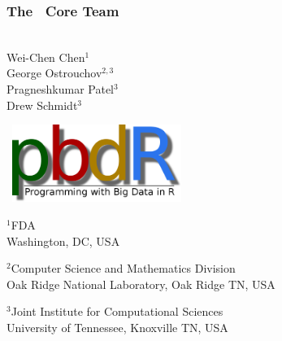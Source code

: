 \frame{\maketitle}

\setcounter{footnote}{0}

\begin{frame}[noframenumbering]
\frametitle{The \pbdR\ Core Team}
\begin{minipage}{1\textwidth}
  \vspace{-.6cm}
\begin{minipage}{3.6cm}
\ \\[.8cm]
Wei-Chen Chen$^1$ \\
George Ostrouchov$^{2,3}$ \\
Pragneshkumar Patel$^3$ \\
Drew Schmidt$^3$\\[2ex]
\end{minipage}
\begin{minipage}{7cm}
  \ \hfill \includegraphics[width=5.5cm]{../common/pics/logos/newpbdr}
\end{minipage}
\end{minipage}
  \begin{minipage}{2.2cm}\tiny
    $^1$FDA\\
    Washington, DC, USA
  \end{minipage}
  \hspace{1ex}
  \begin{minipage}{5cm}\tiny
    $^2$Computer Science and Mathematics Division\\
    Oak Ridge National Laboratory, Oak Ridge TN, USA
  \end{minipage}
  \hspace{1ex}
  \begin{minipage}{4cm}\tiny
    $^3$Joint Institute for Computational Sciences\\
    University of Tennessee, Knoxville TN, USA
  \end{minipage}


\end{frame}
